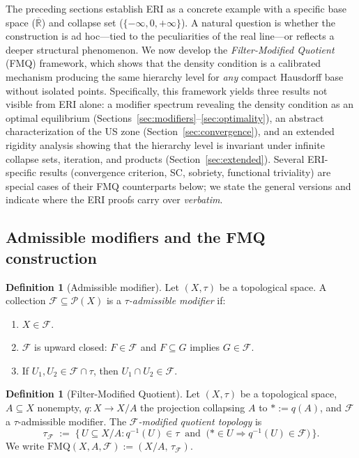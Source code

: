 \documentclass[11pt]{article}
\theoremstyle{definition}
\newtheorem{definition}[theorem]{Definition}
\theoremstyle{remark}
\begin{document}
The preceding sections establish ERI as a concrete example with a
specific base space ($\overline{\mathbb{R}}$) and collapse set
($\{-\infty,0,+\infty\}$).
A natural question is whether the construction is ad hoc---tied to the
peculiarities of the real line---or reflects a deeper structural
phenomenon.
We now develop the \emph{Filter-Modified Quotient} (FMQ)
framework, which shows that the density condition is a calibrated
mechanism producing the same hierarchy level for \emph{any}
compact Hausdorff base without isolated points.
Specifically, this framework yields three results not
visible from ERI alone: a modifier spectrum revealing the density
condition as an optimal equilibrium
(Sections~\ref{sec:modifiers}--\ref{sec:optimality}), an abstract
characterization of the US zone (Section~\ref{sec:convergence}),
and an extended rigidity analysis showing that the hierarchy level
is invariant under infinite collapse sets, iteration, and products
(Section~\ref{sec:extended}).
Several ERI-specific results
(convergence criterion, SC, sobriety, functional triviality) are
special cases of their FMQ counterparts below; we state the general
versions and indicate where the ERI proofs carry over
\emph{verbatim}.

\subsection{Admissible modifiers and the FMQ construction}

\begin{definition}[Admissible modifier]\label{def:admissible}
Let $(X, \tau)$ be a topological space.  A collection
$\mathcal{F} \subseteq \mathcal{P}(X)$ is a
\emph{$\tau$-admissible modifier} if:
\begin{enumerate}[label=\textup{(F\arabic*)},nosep]
\item\label{F1} $X \in \mathcal{F}$.
\item\label{F2} $\mathcal{F}$ is upward closed: $F \in \mathcal{F}$
      and $F \subseteq G$ implies $G \in \mathcal{F}$.
\item\label{F3} If $U_1, U_2 \in \mathcal{F} \cap \tau$, then
      $U_1 \cap U_2 \in \mathcal{F}$.
\end{enumerate}
\end{definition}

\begin{definition}[Filter-Modified Quotient]\label{def:fmq}
Let $(X, \tau)$ be a topological space, $A \subseteq X$ nonempty,
$q\colon X \to X/A$ the projection collapsing $A$ to
$\ast := q(A)$, and $\mathcal{F}$ a $\tau$-admissible modifier.
The \emph{$\mathcal{F}$-modified quotient topology} is
\[
\tau_{\mathcal{F}} \;:=\;
\bigl\{\, U \subseteq X/A :
  q^{-1}(U) \in \tau \;\;\text{and}\;\;
  \bigl(\ast \in U \Longrightarrow q^{-1}(U) \in \mathcal{F}\bigr)
\,\bigr\}.
\]
We write $\mathrm{FMQ}(X, A, \mathcal{F}) := (X/A,\,
\tau_{\mathcal{F}})$.
\end{definition}
\end{document}
